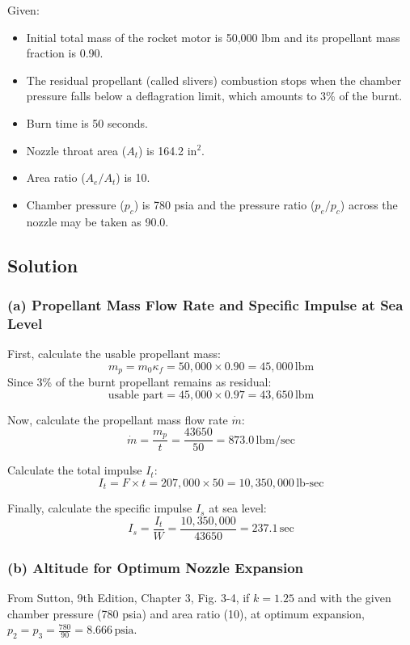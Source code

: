 \documentclass{article}
\begin{document}
Given:
\begin{itemize}
    \item Initial total mass of the rocket motor is 50,000 lbm and its propellant mass fraction is 0.90.
    \item The residual propellant (called slivers) combustion stops when the chamber pressure falls below a deflagration limit, which amounts to 3\% of the burnt.
    \item Burn time is 50 seconds.
    \item Nozzle throat area ($A_t$) is 164.2 in$^2$.
    \item Area ratio ($A_e/A_t$) is 10.
    \item Chamber pressure ($p_c$) is 780 psia and the pressure ratio ($p_e/p_c$) across the nozzle may be taken as 90.0.
\end{itemize}

\subsection{Solution}

\subsubsection{(a) Propellant Mass Flow Rate and Specific Impulse at Sea Level}

First, calculate the usable propellant mass:
\[
m_p = m_0 \kappa_f = 50,000 \times 0.90 = 45,000 \, \text{lbm}
\]
Since 3\% of the burnt propellant remains as residual:
\[
\text{usable part} = 45,000 \times 0.97 = 43,650 \, \text{lbm}
\]

Now, calculate the propellant mass flow rate $\dot{m}$:
\[
\dot{m} = \frac{m_p}{t} = \frac{43650}{50} = 873.0 \, \text{lbm/sec}
\]

Calculate the total impulse $I_t$:
\[
I_t = F \times t = 207,000 \times 50 = 10,350,000 \, \text{lb-sec}
\]

Finally, calculate the specific impulse $I_s$ at sea level:
\[
I_s = \frac{I_t}{W} = \frac{10,350,000}{43650} = 237.1 \, \text{sec}
\]

\subsubsection{(b) Altitude for Optimum Nozzle Expansion}

From Sutton, 9th Edition, Chapter 3, Fig. 3-4, if $k = 1.25$ and with the given chamber pressure (780 psia) and area ratio (10), at optimum expansion, $p_2 = p_3 = \frac{780}{90} = 8.666 \, \text{psia}$.
\end{document}
